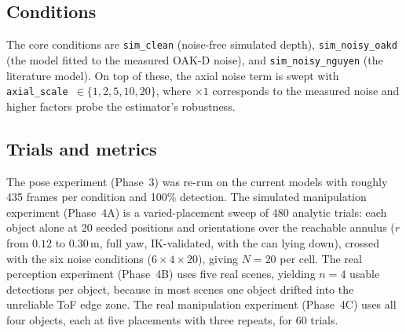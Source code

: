 \begin{table}[t]
\centering
\caption{The four test objects. The jaw capture tolerance is $(55-w)/2$\,mm, where $w$ is
the grasp width and $55$\,mm is the measured real gripper opening.}
\label{tab:objects}
\footnotesize
{}
\end{table}

\subsection{Conditions}
The core conditions are \texttt{sim\_clean} (noise-free simulated depth),
\texttt{sim\_noisy\_oakd} (the model fitted to the measured OAK-D noise), and
\texttt{sim\_noisy\_nguyen} (the literature model). On top of these, the axial noise term
is swept with \texttt{axial\_scale}~$\in\{1,2,5,10,20\}$, where $\times1$ corresponds to
the measured noise and higher factors probe the estimator's robustness.

\subsection{Trials and metrics}
The pose experiment (Phase~3) was re-run on the current models with roughly 435 frames per
condition and 100\% detection. The simulated manipulation experiment (Phase~4A) is a
varied-placement sweep of 480 analytic trials: each object alone at 20 seeded positions and
orientations over the reachable annulus ($r$ from $0.12$ to $0.30$\,m, full yaw,
IK-validated, with the can lying down), crossed with the six noise conditions
($6\times4\times20$), giving $N=20$ per cell. The real perception experiment (Phase~4B)
uses five real scenes, yielding $n=4$ usable detections per object, because in most scenes
one object drifted into the unreliable ToF edge zone. The real manipulation experiment
(Phase~4C) uses all four objects, each at five placements with three repeats, for 60
trials.

